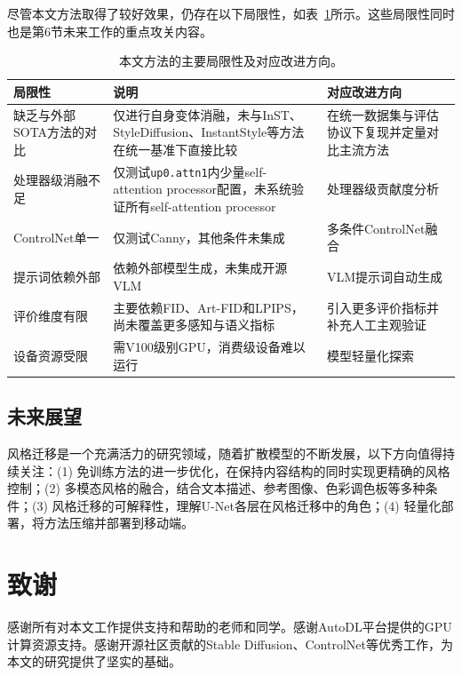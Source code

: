 \documentclass[10pt,twocolumn]{article}
\begin{document}
尽管本文方法取得了较好效果，仍存在以下局限性，如表~\ref{tab:limitations}所示。这些局限性同时也是第6节未来工作的重点攻关内容。

\begin{table}[htbp]
  \centering
  \caption{本文方法的主要局限性及对应改进方向。}
  \label{tab:limitations}
  \small
  \setlength{\tabcolsep}{3pt}
  \begin{tabular}{p{2.2cm}p{3.2cm}p{2.2cm}}
    \toprule
    局限性 & 说明 & 对应改进方向 \\
    \midrule
    缺乏与外部SOTA方法的对比 & 仅进行自身变体消融，未与InST、StyleDiffusion、InstantStyle等方法在统一基准下直接比较 & 在统一数据集与评估协议下复现并定量对比主流方法 \\
    处理器级消融不足 & 仅测试\texttt{up0.attn1}内少量self-attention processor配置，未系统验证所有self-attention processor & 处理器级贡献度分析 \\
    ControlNet单一 & 仅测试Canny，其他条件未集成 & 多条件ControlNet融合 \\
    提示词依赖外部 & 依赖外部模型生成，未集成开源VLM & VLM提示词自动生成 \\
    评价维度有限 & 主要依赖FID、Art-FID和LPIPS，尚未覆盖更多感知与语义指标 & 引入更多评价指标并补充人工主观验证 \\
    设备资源受限 & 需V100级别GPU，消费级设备难以运行 & 模型轻量化探索 \\
    
    \bottomrule
  \end{tabular}
\end{table}

\subsection{未来展望}

风格迁移是一个充满活力的研究领域，随着扩散模型的不断发展，以下方向值得持续关注：(1) 免训练方法的进一步优化，在保持内容结构的同时实现更精确的风格控制；(2) 多模态风格的融合，结合文本描述、参考图像、色彩调色板等多种条件；(3) 风格迁移的可解释性，理解U-Net各层在风格迁移中的角色；(4) 轻量化部署，将方法压缩并部署到移动端。

\section*{致谢}
感谢所有对本文工作提供支持和帮助的老师和同学。感谢AutoDL平台提供的GPU计算资源支持。感谢开源社区贡献的Stable Diffusion、ControlNet等优秀工作，为本文的研究提供了坚实的基础。
\end{document}
